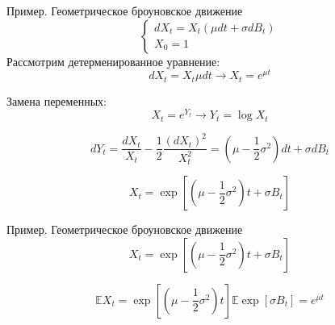 \documentclass{beamer}
\begin{document}
\begin{frame}{Пример. Геометрическое броуновское движение}
    $$\begin{cases}
            dX_t = X_t \left( \mu dt + \sigma dB_t \right) \\
            X_0 = 1
    \end{cases}$$
      Рассмотрим детерменированное уравнение:
    $$
        dX_t = X_t \mu dt \to X_t = e^{\mu t}
    $$
     
    Замена переменных:
    $$X_t = e^{Y_t} \longrightarrow  Y_t = \log X_t$$
      
    $$d Y_t = \dfrac{d X_t}{X_t} - \dfrac{1}{2} \dfrac{(dX_t)^2}{X_t^2} =\left( \mu - \dfrac{1}{2}\sigma^2 \right) dt + \sigma dB_t$$
     
    $$X_t = \exp\left[ \left( \mu - \dfrac{1}{2}\sigma^2 \right) t + \sigma B_t \right]$$
\end{frame}

\begin{frame}{Пример. Геометрическое броуновское движение}
    $$X_t = \exp\left[ \left( \mu - \dfrac{1}{2}\sigma^2 \right) t + \sigma B_t \right]$$
    
    $$
        \mathbb{E} X_t =   \exp \left[ \left( \mu - \dfrac{1}{2}\sigma^2 \right) t \right] \mathbb{E} \exp \left[
            \sigma B_t
        \right] =   e^{\mu t}
    $$
    \pause
\end{frame}
\end{document}
